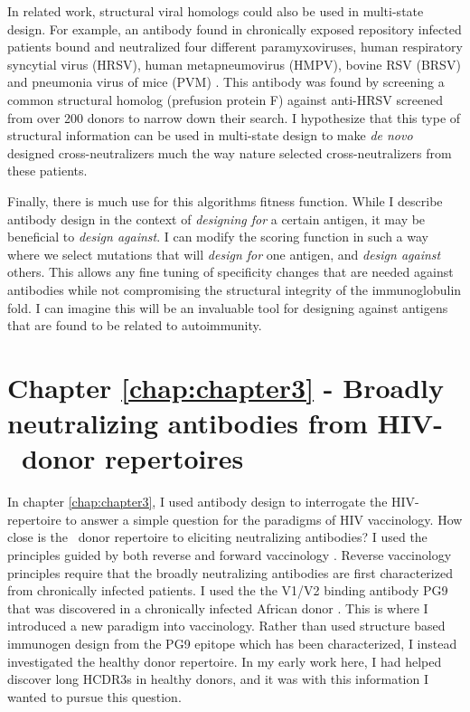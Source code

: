 In related work, structural viral homologs could also be used in multi-state design. For example, an antibody found in chronically exposed repository infected patients bound and neutralized four different paramyxoviruses, human respiratory syncytial virus (HRSV), human metapneumovirus (HMPV), bovine RSV (BRSV) and pneumonia virus of mice (PVM) \citep{Corti:2013cv}. This antibody was found by screening a common structural homolog (prefusion protein F) against anti-HRSV screened from over 200 donors to narrow down their search. I hypothesize that this type of structural information can be used in multi-state design to make \textit{de novo} designed cross-neutralizers much the way nature selected cross-neutralizers from these patients.

Finally, there is much use for this algorithms fitness function. While I describe antibody design in the context of \textit{designing for} a certain antigen, it may be beneficial to \textit{design against}. I can modify the scoring function in such a way where we select mutations that will \textit{design for} one antigen, and \textit{design against} others. This allows any fine tuning of specificity changes that are needed against antibodies while not compromising the structural integrity of the immunoglobulin fold. I can imagine this will be an invaluable tool for designing against antigens that are found to be related to autoimmunity.

\section{Chapter \ref{chap:chapter3} - Broadly neutralizing antibodies from HIV-\naive~donor repertoires}
In chapter \ref{chap:chapter3}, I used antibody design to interrogate the HIV-\naive repertoire to answer a simple question for the paradigms of HIV vaccinology. How close is the \naive~donor repertoire to eliciting neutralizing antibodies? I used the principles guided by both reverse  and forward vaccinology \citep{Burton:2012bh}. Reverse vaccinology principles require that the broadly neutralizing antibodies are first characterized from chronically infected patients. I used the the V1/V2 binding antibody PG9 that was discovered in a chronically infected African donor \citep{McLellan:2011dg,Walker:2009cd}. This is where I introduced a new paradigm into vaccinology. Rather than used structure based immunogen design from the PG9 epitope which has been characterized, I instead investigated the healthy donor repertoire. In my early work here, I had helped discover long HCDR3s in healthy donors, and it was with this information I wanted to pursue this question.

